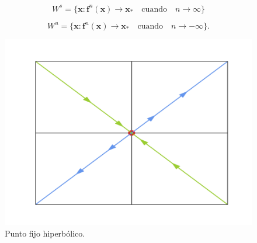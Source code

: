 \documentclass[11pt]{beamer}
\theoremstyle{definition}
\begin{document}
\begin{frame}
\begin{definition}
	\begin{equation}
	W^{s}=\lbrace \mathbf{x} : \mathbf{f}^{n}(\mathbf{x})\rightarrow \mathbf{x}_{*} \quad \mathrm{cuando} \quad n\rightarrow \infty \rbrace
	\label{variedad estable}
	\end{equation}
	
	\begin{equation}
	W^{u}=\lbrace \mathbf{x} : \mathbf{f}^{n}(\mathbf{x})\rightarrow \mathbf{x}_{*} \quad \mathrm{cuando} \quad n\rightarrow -\infty \rbrace.
	\label{variedad inestable}
	\end{equation}
	
\end{definition}

\begin{figure}
\centering
\includegraphics[scale=0.4]{hyperbolic2.pdf}
\caption{Punto fijo hiperb\'olico.}
\label{hiperbolico}
\end{figure}

\end{frame}
\end{document}
